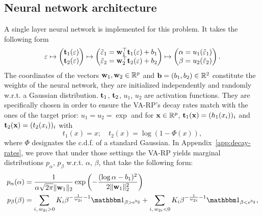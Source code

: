 \subsection{Neural network architecture}


A single layer neural network is implemented for this problem. It takes the following form
\begin{equation}\label{eq:neuralnet-architecture}
    \varepsilon \mapsto \begin{pmatrix}
        \mathbf{t}_1(\varepsilon)\\ \mathbf{t}_2(\varepsilon) 
    \end{pmatrix} \mapsto
    \begin{pmatrix}
        \tilde{\varepsilon}_1 = \mathbf{w}_1^\top\mathbf{t}_1(\varepsilon) + b_1 \\
        \tilde{\varepsilon}_2 = \mathbf{w}_2^\top\mathbf{t}_2(\varepsilon)+b_2 
    \end{pmatrix} \mapsto
    \begin{pmatrix}
        \alpha = u_1(\tilde{\varepsilon}_1)\\
        \beta = u_2(\tilde{\varepsilon}_2)
    \end{pmatrix}.
\end{equation}
The coordinates of the vectors $\mathbf{w}_1,\mathbf{w}_2\in\mathbb{R}^p$ and $\mathbf{b}=(b_1,b_2)\in\mathbb{R}^2$ constitute the weights of the neural network, they are initialized independently and randomly w.r.t. a Gaussian distribution. $\mathbf{t}_1$, $\mathbf{t}_2$, $u_1$, $u_2$ are activation functions.
They are specifically chosen in order to ensure the VA-RP's decay rates match with the ones of the target prior: $u_1=u_2=\exp$ and for $\mathbf{x}\in\mathbb{R}^p$, $\mathbf{t}_1(\mathbf{x})=(h_1(x_i))_i$ and $\mathbf{t}_2(\mathbf{x})=(t_2(x_i))_i$ with
\begin{equation}
    t_1(x) = x;\quad t_2(x) = \log(1-\Phi(x)),
\end{equation}
where $\Phi$ designates the c.d.f. of a standard Gaussian.
In Appendix~\ref{app:decay-rates}, we prove that under those settings the VA-RP yields marginal distributions $ p_\alpha$, $p_\beta$ w.r.t. $\alpha$, $\beta$, that take the following form:
    \begin{equation}
        \begin{aligned}
        p_\alpha(\alpha) &= \frac{1}{\alpha\sqrt{2\pi}\|\mbf w_1 \|_2}\exp\left(-\frac{(\log\alpha - b_1)^2}{2\|\mbf w_1\|^2_2}\right) \\
        p_\beta(\beta) &= \sum_{i,\, w_{2i}>0}{K_i}\beta^{-\frac{1}{w_{2i}}-1}\indic_{\beta>e^{b_2}} + \sum_{i,\, w_{2i}<0}K_i\beta^{-\frac{1}{w_{2i}}-1}\indic_{\beta<e^{b_2}},
    \end{aligned}
    \label{eq:marginaldist}
    \end{equation}
